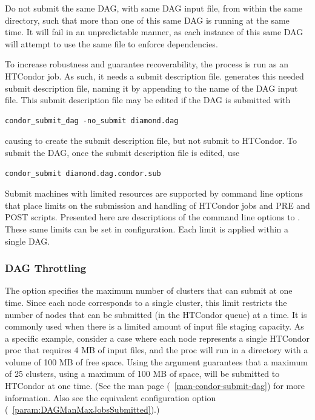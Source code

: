 Do not submit the same DAG, with same DAG input file, 
from within the same directory, 
such that more than one of this same DAG is running at the same time.
It will fail in an unpredictable manner,
as each instance of this same DAG will attempt to use the same
file to enforce dependencies.
 
To increase robustness and guarantee recoverability, the 
 process is run as an HTCondor job.
As such, it needs a submit description file.
 generates this needed submit description file,
naming it by appending  to the name of the DAG input file.
This submit description file may be edited if the DAG is submitted with

\begin{verbatim}
condor_submit_dag -no_submit diamond.dag
\end{verbatim}
causing  to create the submit description file,
but not submit  to HTCondor.
To submit the DAG, once the submit description file is edited,
use

\begin{verbatim}
condor_submit diamond.dag.condor.sub
\end{verbatim}

Submit machines with limited resources are supported by
command line options that place limits on the submission and handling 
of HTCondor jobs and PRE and POST scripts. 
Presented here are descriptions of the command line options
to .
These same limits can be set in configuration.
Each limit is applied within a single DAG.

\subsubsection{\label{sec:DAG-throttling}DAG Throttling}

The  option 
specifies the maximum number of clusters that 
can submit at one time.
Since each node corresponds to a single cluster,
this limit restricts the number of nodes that can be submitted (in the
HTCondor queue) at a time.
It is commonly used when
there is a limited amount of input file staging capacity.
As a specific example, consider a case where each node represents
a single HTCondor proc that requires 4 MB of input files,
and the proc will run in a directory with a volume of 100 MB
of free space.
Using the argument  guarantees that a maximum
of 25 clusters, using a maximum of 100 MB of space,
will be submitted to HTCondor at one time.
(See the  man page (~\ref{man-condor-submit-dag})
for more information.  Also see the equivalent
 configuration option
(~\ref{param:DAGManMaxJobsSubmitted}).)

